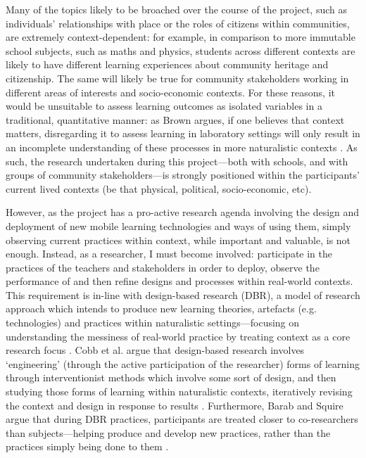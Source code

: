 Many of the topics likely to be broached over the course of the project, such as individuals' relationships with place or the roles of citizens within communities, are extremely context-dependent: for example, in comparison to more immutable school subjects, such as maths and physics, students across different contexts are likely to have different learning experiences about community heritage and citizenship. The same will likely be true for community stakeholders working in different areas of interests and socio-economic contexts. For these reasons, it would be unsuitable to assess learning outcomes as isolated variables in a traditional, quantitative manner: as Brown argues, if one believes that context matters, disregarding it to assess learning in laboratory settings will only result in an incomplete understanding of these processes in more naturalistic contexts \citep{brown1992}. As such, the research undertaken during this project---both with schools, and with groups of community stakeholders---is strongly positioned within the participants' current lived contexts (be that physical, political, socio-economic, etc).

However, as the project has a pro-active research agenda involving the design and deployment of new mobile learning technologies and ways of using them, simply observing current practices within context, while important and valuable, is not enough. Instead, as a researcher, I must become involved: participate in the practices of the teachers and stakeholders in order to deploy, observe the performance of and then refine designs and processes within real-world contexts. This requirement is in-line with design-based research (DBR), a model of research approach which intends to produce new learning theories, artefacts (e.g. technologies) and practices within naturalistic settings---focusing on understanding the messiness of real-world practice by treating context as a core research focus \citep{Barab2004}. Cobb et al. argue that design-based research involves `engineering' (through the active participation of the researcher) forms of learning through interventionist methods which involve some sort of design, and then studying those forms of learning within naturalistic contexts, iteratively revising the context and design in response to results \citep{cobb2003}. Furthermore, Barab and Squire argue that during DBR practices, participants are treated closer to co-researchers than subjects---helping produce and develop new practices, rather than the practices simply being done to them \citep{Barab2004}.

